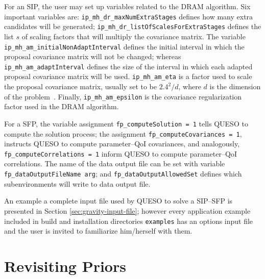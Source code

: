 For an SIP, the user may set up variables related to the DRAM algorithm. Six important variables are:  
\texttt{ip\_mh\_dr\_maxNumExtraStages} defines how many extra candidates will be generated; 
\texttt{ip\_mh\_dr\_listOfScalesForExtraStages} defines the list $s$ of scaling factors that will multiply the covariance matrix.
The variable \texttt{ip\_mh\_am\_initialNonAdaptInterval} defines the initial interval in which the proposal covariance matrix will not be changed;
whereas \texttt{ip\_mh\_am\_adaptInterval} defines the size of the interval in which each adapted proposal covariance matrix will be used. 
\texttt{ip\_mh\_am\_eta} is a factor used to scale the proposal covariance matrix, usually set to be $2.4^2/d$, where $d$ is the dimension of the problem~\cite{Laine08,HaLaMiSa06}. 
Finally, \texttt{ip\_mh\_am\_epsilon} is the covariance regularization factor used in the DRAM algorithm. %

For a SFP, the variable assignment \verb+fp_computeSolution = 1+ tells QUESO to compute the solution process; the assignment \verb+fp_computeCovariances = 1+,  instructs QUESO to compute parameter--QoI covariances, and analogously, \verb+fp_computeCorrelations = 1+ inform QUESO to compute  parameter--QoI correlations. The name of the data output file can be set with variable \verb+fp_dataOutputFileName arg+;  and \verb+fp_dataOutputAllowedSet+ defines which subenvironments will write to data output file.

An example a complete input file used by QUESO to solve a SIP--SFP is presented in Section \ref{sec:gravity-input-file}; however every application example included in \Queso{} build and installation directories \verb+examples+ has an options input file and the user is invited to familiarize him/herself with them.



\section{Revisiting Priors}

